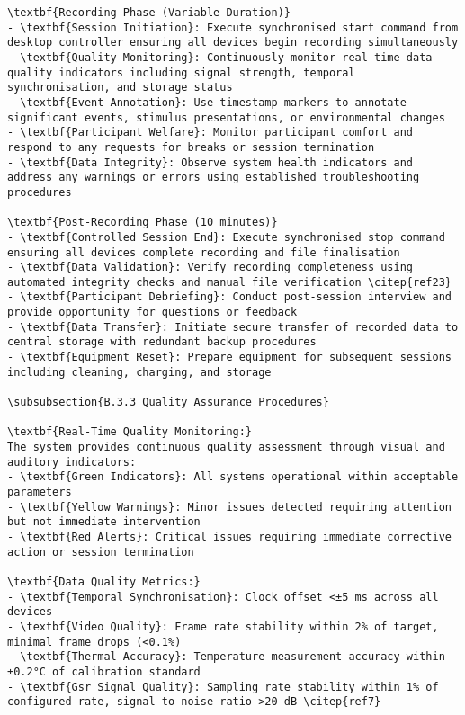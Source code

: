 \begin{verbatim}
\textbf{Recording Phase (Variable Duration)}
- \textbf{Session Initiation}: Execute synchronised start command from desktop controller ensuring all devices begin recording simultaneously
- \textbf{Quality Monitoring}: Continuously monitor real-time data quality indicators including signal strength, temporal synchronisation, and storage status
- \textbf{Event Annotation}: Use timestamp markers to annotate significant events, stimulus presentations, or environmental changes
- \textbf{Participant Welfare}: Monitor participant comfort and respond to any requests for breaks or session termination
- \textbf{Data Integrity}: Observe system health indicators and address any warnings or errors using established troubleshooting procedures

\textbf{Post-Recording Phase (10 minutes)}
- \textbf{Controlled Session End}: Execute synchronised stop command ensuring all devices complete recording and file finalisation
- \textbf{Data Validation}: Verify recording completeness using automated integrity checks and manual file verification \citep{ref23}
- \textbf{Participant Debriefing}: Conduct post-session interview and provide opportunity for questions or feedback
- \textbf{Data Transfer}: Initiate secure transfer of recorded data to central storage with redundant backup procedures
- \textbf{Equipment Reset}: Prepare equipment for subsequent sessions including cleaning, charging, and storage

\subsubsection{B.3.3 Quality Assurance Procedures}

\textbf{Real-Time Quality Monitoring:}
The system provides continuous quality assessment through visual and auditory indicators:
- \textbf{Green Indicators}: All systems operational within acceptable parameters
- \textbf{Yellow Warnings}: Minor issues detected requiring attention but not immediate intervention
- \textbf{Red Alerts}: Critical issues requiring immediate corrective action or session termination

\textbf{Data Quality Metrics:}
- \textbf{Temporal Synchronisation}: Clock offset <±5 ms across all devices
- \textbf{Video Quality}: Frame rate stability within 2% of target, minimal frame drops (<0.1%)
- \textbf{Thermal Accuracy}: Temperature measurement accuracy within ±0.2°C of calibration standard
- \textbf{Gsr Signal Quality}: Sampling rate stability within 1% of configured rate, signal-to-noise ratio >20 dB \citep{ref7}


\end{verbatim}
